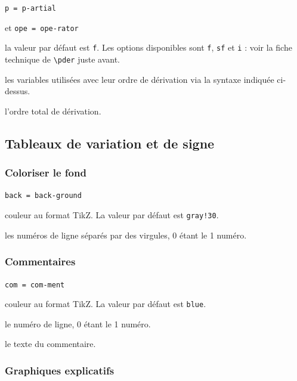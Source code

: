\documentclass[12pt,a4paper]{book}
\newcommand\env[1]{\texttt{#1}}
\newcommand\macro[1]{\env{\textbackslash{}#1}}
\theoremstyle{definition}
\newcommand\mwhyprefix[2]{%
	\texttt{#1 = #1-#2}%
}
\begin{document}
{{ \hfill \mwhyprefix{p}{artial}
                            et \mwhyprefix{ope}{rator}

\IDoption{} la valeur par défaut est \verb+f+. Les options disponibles sont \verb+f+, \verb+sf+ et \verb+i+ : voir la fiche technique de \macro{pder} juste avant.

 les variables utilisées avec leur ordre de dérivation via la syntaxe indiquée ci-dessus.

 l'ordre total de dérivation.











\subsection{Tableaux de variation et de signe}



\subsubsection{Coloriser le fond}

 \hfill \mwhyprefix{back}{ground}


\IDoption{} couleur au format TikZ.
            La valeur par défaut est \verb+gray!30+.


 les numéros de ligne séparés par des virgules, $0$ étant le 1\ier{} numéro.




\subsubsection{Commentaires}

 \hfill \mwhyprefix{com}{ment}


\IDoption{} couleur au format TikZ.
            La valeur par défaut est \verb+blue+.


 le numéro de ligne, $0$ étant le 1\ier{} numéro.

 le texte du commentaire.




\subsubsection{Graphiques explicatifs}

}}
\end{document}
